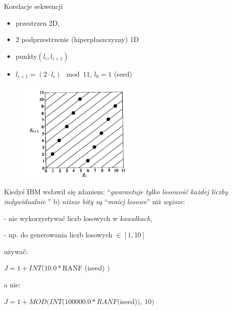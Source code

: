 \begin{frame}{Korelacje sekwencji}
\begin{itemize}
    \item przestrzen 2D,
    \item 2 podprzestrzenie (hiperpłaszczyzny) 1D
    \item punkty$(l_i, l_{i+1})$
    \item $l_{i+1}=(2\cdot l_i) \mod 11$, $l_0=1$ (seed)
\end{itemize}
 

    \begin{figure}
        \centering
        \includegraphics[width=0.5\textwidth]{img/14/korelacje.png}
        \label{fig:my_label}
    \end{figure}
\end{frame}
    \begin{frame}
	Kiedyś IBM wsławił się zdaniem: ``{\it gwarantuje tylko losowość każdej liczby indywidualnie }''
    \newline
    \newline
	b) {\it niższe bity są} ``{\it mniej losowe}'' niż {\it wyższe}:

    - nie wykorzystywać liczb losowych w {\it kawałkach},

	- np. do generowania liczb losowych $\in[1, 10 ]$

	używać:

	$J=1+INT(10.0*$RANF (iseed) $)$

	a nie:

	$J=1+MOD(INT(100000.0*RANF($iseed)$),\ 10)$
    \end{frame}
